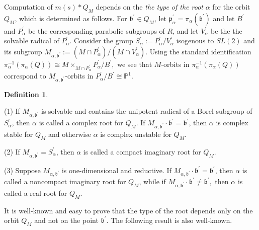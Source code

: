 \documentclass[12pt]{amsart}
\numberwithin{equation}{section}
\theoremstyle{remark}
\theoremstyle{definition}
\newtheorem{dfn}[thm]{Definition}
\newcommand{\fp}{\mbox{${\mathfrak p}$}}
\newcommand{\fb}{\mbox{${\mathfrak b}$}}
\newcommand{\PR}{\mbox{${\mathbb P}$}}
\begin{document}
Computation of $m(s)*Q_{M}$ depends on the \emph{the type of the root} $\alpha$ for the orbit $Q_{M}$, which is determined as follows.  For $\fb^{\prime}\in Q_M$, let $\fp_{\alpha}^{\prime} = \pi_{\alpha}(\fb^{\prime})$ and let $B^{\prime}$ and $P_{\alpha}^{\prime}$ be the corresponding parabolic subgroups of $R$, and let $V_{\alpha}^{\prime}$ be the the solvable radical of $P_{\alpha}^{\prime}$.  Consider the group 
$S_{\alpha}^{\prime}:= P_{\alpha}^{\prime}/V_{\alpha}^{\prime}$ isogenous to $SL(2)$ and its subgroup 
$M_{\alpha, \fb^{\prime}}:= (M \cap P_{\alpha}^{\prime})/(M\cap V_{\alpha}^{\prime})$.
 Using the standard identification $\pi_{\alpha}^{-1}(\pi_{\alpha}(Q)) \cong M\times_{M\cap P_{\alpha}^{\prime}} P_{\alpha}^{\prime}/B^{\prime},$ we see that $M$-orbits in
 $\pi_{\alpha}^{-1}(\pi_{\alpha}(Q))$ correspond to $M_{\alpha, \fb^{\prime}}$-orbits in 
$P^{\prime}_{\alpha}/B^{\prime}\cong {\PR}^1.$  

\begin{dfn}\label{d:roottype}
\par\noindent (1) If $M_{\alpha, \fb^{\prime}}$ is solvable and contains the unipotent radical of a Borel subgroup of $S_{\alpha}^{\prime}$, then $\alpha$ is called a complex root for $Q_M$.  If $M_{\alpha, \fb^{\prime}}\cdot \fb^{\prime}=\fb^{\prime}$, then $\alpha$ is complex stable for $Q_M$ and otherwise $\alpha$ is complex unstable for $Q_M$.
\par\noindent (2) If $M_{\alpha, \fb^{\prime}}=S_{\alpha}^{\prime}$, then $\alpha$ is called a compact imaginary root for $Q_M.$
\par\noindent (3) Suppose $M_{\alpha, \fb^{\prime}}$ is one-dimensional and reductive.
If $M_{\alpha,\fb^{\prime}}\cdot \fb^{\prime}=\fb^{\prime}$, then $\alpha$ is called a noncompact imaginary root for $Q_M$, while if $M_{\alpha,\fb^{\prime}}\cdot \fb^{\prime}\not=\fb^{\prime},$ then $\alpha$ is called a real root for $Q_M.$
\end{dfn}

It is well-known and easy to prove that the type of the root depends only on the orbit $Q_M$ and not on the point $\fb^{\prime}.$ The following result is also well-known. 
\end{document}

